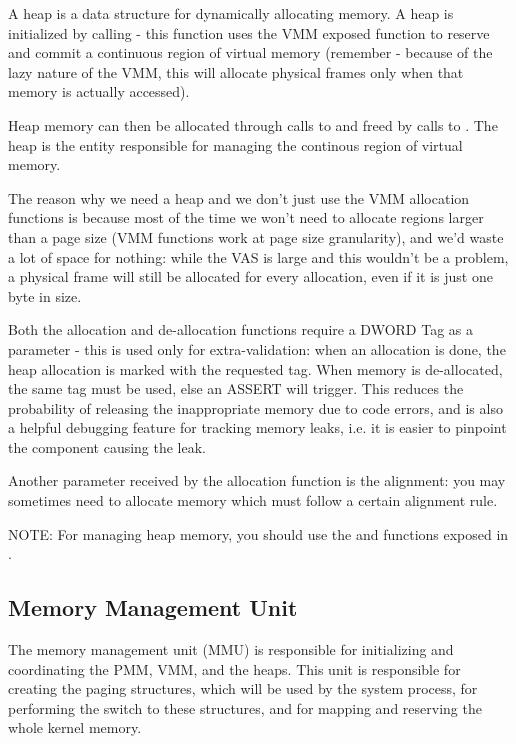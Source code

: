 \begin{appendices}
A heap is a data structure for dynamically allocating memory. A heap is initialized by calling
 - this function uses the VMM exposed function  to
reserve and commit a continuous region of virtual memory (remember - because of the lazy nature of
the VMM, this will allocate physical frames only when that memory is actually accessed).

Heap memory can then be allocated through calls to  and freed by calls
to . The heap is the entity responsible for managing the continous region
of virtual memory.

The reason why we need a heap and we don't just use the VMM allocation functions is because most of
the time we won't need to allocate regions larger than a page size (VMM functions work at page size
granularity), and we'd waste a lot of space for nothing: while the VAS is large and this wouldn't be
a problem, a physical frame will still be allocated for every allocation, even if it is just one byte
in size.

Both the allocation and de-allocation functions require a DWORD Tag as a parameter - this is used
only for extra-validation: when an allocation is done, the heap allocation is marked with the
requested tag. When memory is de-allocated, the same tag must be used, else an ASSERT will trigger.
This reduces the probability of releasing the inappropriate memory due to code errors, and is also a
helpful debugging feature for tracking memory leaks, i.e. it is easier to pinpoint the component
causing the leak.

Another parameter received by the allocation function is the alignment: you may sometimes need to
allocate memory which must follow a certain alignment rule.

NOTE: For managing heap memory, you should use the  and 
 functions exposed in .

\subsection{Memory Management Unit}
\label{sect:MMU}

The memory management unit (MMU) is responsible for initializing and coordinating the PMM, VMM, and
the heaps. This unit is responsible for creating the paging structures, which will be used by the
system process, for performing the switch to these structures, and for mapping and reserving the
whole kernel memory.


\end{appendices}
